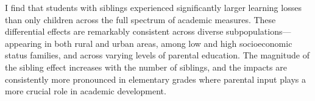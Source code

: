 



I find that students with siblings experienced significantly larger learning losses than only children across the full spectrum of academic measures. These differential effects are remarkably consistent across diverse subpopulations—appearing in both rural and urban areas, among low and high socioeconomic status families, and across varying levels of parental education. The magnitude of the sibling effect increases with the number of siblings, and the impacts are consistently more pronounced in elementary grades where parental input plays a more crucial role in academic development.

